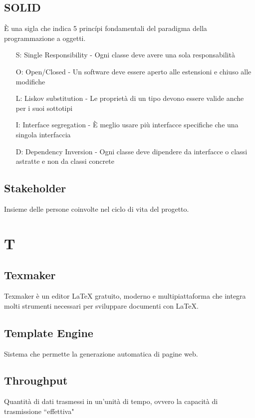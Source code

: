 {	\subsection{SOLID}
	\`E una sigla che indica 5 princ\'{i}pi fondamentali del paradigma della programmazione a oggetti.
	\begin{itemize}
		\item[S:] Single Responsibility - Ogni classe deve avere una sola responsabilità
		\item[O:] Open/Closed - Un software deve essere aperto alle estensioni e chiuso alle modifiche
		\item[L:] Liskov substitution - Le proprietà di un tipo devono essere valide anche per i suoi sottotipi
		\item[I:] Interface segregation - \`E meglio usare più interfacce specifiche che una singola interfaccia
		\item[D:] Dependency Inversion - Ogni classe deve dipendere da interfacce o classi astratte e non da classi concrete
	\end{itemize}	 
	
	\subsection{Stakeholder}
	Insieme delle persone coinvolte nel ciclo di vita del progetto.
	
	\section{T}
	\subsection{Texmaker} 
	Texmaker è un editor LaTeX gratuito, moderno e multipiattaforma che integra molti strumenti necessari per sviluppare documenti con LaTeX. 
	
	\subsection{Template Engine}
	Sistema che permette la generazione automatica di pagine web.
	
	\subsection{Throughput}
	Quantità di dati trasmessi in un'unità di tempo, ovvero la capacità di trasmissione ``effettiva"
		
}
